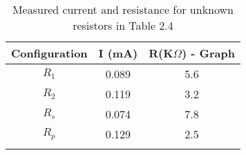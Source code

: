\begin{table}[H]
    \centering
    \begin{tabular}{ccc}
    
    \hline
    Configuration & I (mA) & R(K$\Omega$) - Graph  \\
    \hline
    $R_1$ &  0.089 & 5.6 \\
    $R_2$ &  0.119 & 3.2 \\
    $R_s$ &  0.074 & 7.8 \\
    $R_p$ &  0.129 & 2.5 \\
    \hline
    \space
    
\end{tabular}
\caption{Measured current and resistance for unknown resistors in Table 2.4}
\end{table}
    